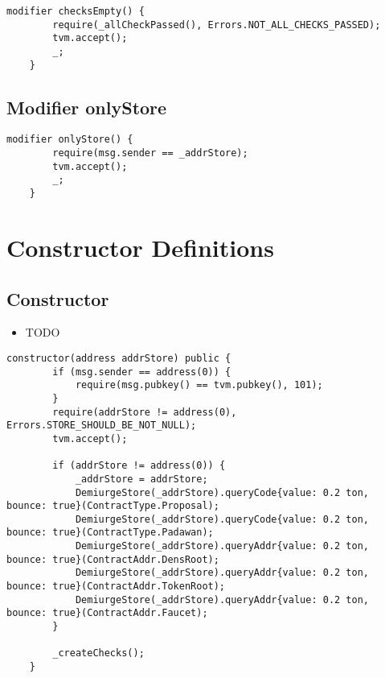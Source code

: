 \begin{lstlisting}[firstnumber=66]
    modifier checksEmpty() {
        require(_allCheckPassed(), Errors.NOT_ALL_CHECKS_PASSED);
        tvm.accept();
        _;
    }
\end{lstlisting}

\subsection{Modifier onlyStore}


\begin{lstlisting}[firstnumber=72]
    modifier onlyStore() {
        require(msg.sender == _addrStore);
        tvm.accept();
        _;
    }
\end{lstlisting}

\section{Constructor Definitions}


\subsection{Constructor}

\begin{itemize}
\item TODO
\end{itemize}

\begin{lstlisting}[firstnumber=82]
    constructor(address addrStore) public {
        if (msg.sender == address(0)) {
            require(msg.pubkey() == tvm.pubkey(), 101);
        }
        require(addrStore != address(0), Errors.STORE_SHOULD_BE_NOT_NULL);
        tvm.accept();
        
        if (addrStore != address(0)) {
            _addrStore = addrStore;
            DemiurgeStore(_addrStore).queryCode{value: 0.2 ton, bounce: true}(ContractType.Proposal);
            DemiurgeStore(_addrStore).queryCode{value: 0.2 ton, bounce: true}(ContractType.Padawan);
            DemiurgeStore(_addrStore).queryAddr{value: 0.2 ton, bounce: true}(ContractAddr.DensRoot);
            DemiurgeStore(_addrStore).queryAddr{value: 0.2 ton, bounce: true}(ContractAddr.TokenRoot);
            DemiurgeStore(_addrStore).queryAddr{value: 0.2 ton, bounce: true}(ContractAddr.Faucet);
        }

        _createChecks();
    }
\end{lstlisting}

